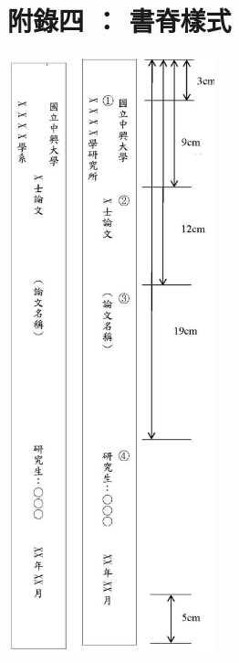 \documentclass[12pt,oneside,openany,a4paper]{book}
\begin{document}
\chapter{附錄四 ： 書脊樣式}
    \begin{center}
        \includegraphics[bb=0 0 638 1841,width=0.45\textwidth]{ridge.jpg}
    \end{center}
\end{document}
